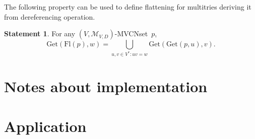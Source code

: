\documentclass{article}
\theoremstyle{definition}
\newtheorem{St}{Statement}
\newcommand{\setcharmvcn}{M}
\newcommand{\setsymbol}[3]{\mathcal{#1}_{#2,#3}}
\newcommand{\setmvcn}[2]{\setsymbol{\setcharmvcn}{#1}{#2}}
\newcommand{\flatten}{\mathrm{Fl}}
\newcommand{\derefsymbol}{\mathrm{Get}}
\newcommand{\deref}[2]{\derefsymbol(#1, #2)}
\begin{document}
The following property can be used to define flattening for multitries
deriving it from dereferencing operation.
\begin{St}\label{st:deref-flatten}
For any $(V,\setmvcn{V}{D})$-MVCNset~$p$,
\[
  \deref{\flatten(p)}{w} =
      \bigcup_{u,v\in V^\ast: uv = w}
        \deref{\deref{p}{u}}{v} .
\]
\end{St}

\section{Notes about implementation}

\section{Application}
\end{document}
